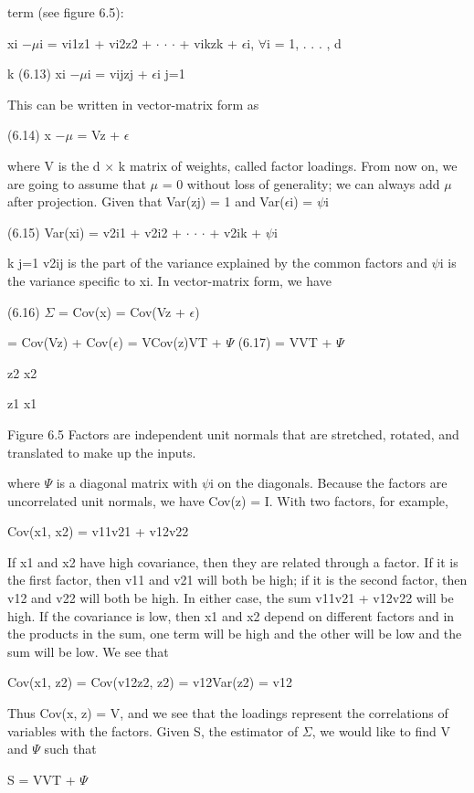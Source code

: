 term (see figure 6.5):

xi $-$$\mu$i = vi1z1 + vi2z2 + $\cdot$ $\cdot$ $\cdot$ + vikzk + $\epsilon$i, $\forall$i = 1, . . . , d

k (6.13) xi $-$$\mu$i = vijzj + $\epsilon$i j=1

This can be written in vector-matrix form as

(6.14) x $-$$\mu$ = Vz + $\epsilon$

where V is the d $\times$ k matrix of weights, called factor loadings. From now on, we are going to assume that $\mu$ = 0 without loss of generality; we can always add $\mu$ after projection. Given that Var(zj) = 1 and Var($\epsilon$i) = $\psi$i

(6.15) Var(xi) = v2i1 + v2i2 + $\cdot$ $\cdot$ $\cdot$ + v2ik + $\psi$i

k j=1 v2ij is the part of the variance explained by the common factors and $\psi$i is the variance specific to xi. In vector-matrix form, we have

(6.16) $\Sigma$ = Cov(x) = Cov(Vz + $\epsilon$)

= Cov(Vz) + Cov($\epsilon$) = VCov(z)VT + $\Psi$ (6.17) = VVT + $\Psi$

z2 x2

z1 x1

Figure 6.5 Factors are independent unit normals that are stretched, rotated, and translated to make up the inputs.

where $\Psi$ is a diagonal matrix with $\psi$i on the diagonals. Because the factors are uncorrelated unit normals, we have Cov(z) = I. With two factors, for example,

Cov(x1, x2) = v11v21 + v12v22

If x1 and x2 have high covariance, then they are related through a factor. If it is the first factor, then v11 and v21 will both be high; if it is the second factor, then v12 and v22 will both be high. In either case, the sum v11v21 + v12v22 will be high. If the covariance is low, then x1 and x2 depend on different factors and in the products in the sum, one term will be high and the other will be low and the sum will be low. We see that

Cov(x1, z2) = Cov(v12z2, z2) = v12Var(z2) = v12

Thus Cov(x, z) = V, and we see that the loadings represent the correlations of variables with the factors. Given S, the estimator of $\Sigma$, we would like to find V and $\Psi$ such that

S = VVT + $\Psi$

